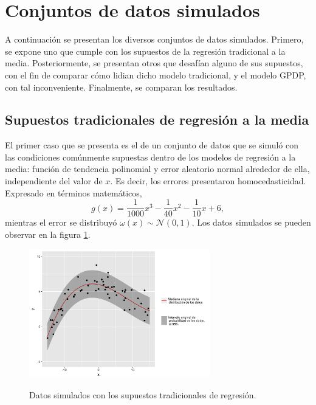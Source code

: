 \section{Conjuntos de datos simulados}

A continuaci\'on se presentan los diversos conjuntos de datos simulados. Primero, se expone uno que cumple con los supuestos de la regresi\'on tradicional a la media. Posteriormente, se presentan otros que desaf\'ian alguno de sus supuestos, con el fin de comparar c\'omo lidian dicho modelo tradicional, y el modelo GPDP, con tal inconveniente. Finalmente, se comparan los resultados.

\subsection{Supuestos tradicionales de regresi\'on a la media}

El primer caso que se presenta es el de un conjunto de datos que se simul\'o con las condiciones com\'unmente supuestas dentro de los modelos de regresi\'on a la media: funci\'on de tendencia polinomial y error aleatorio normal alrededor de ella, independiente del valor de $x$. Es decir, los errores presentaron homocedasticidad. Expresado en t\'erminos matem\'aticos,
\begin{equation*}
    g(x) = \frac{1}{1000}x^3 - \frac{1}{40}x^2 - \frac{1}{10}x + 6,
\end{equation*}
mientras el error se distribuy\'o $\omega(x) \sim \mathcal{N}(0,1)$. Los datos simulados se pueden observar en la figura \ref{sample_classic}.

\begin{figure}[H]
	\centering
	\caption{Datos simulados con los supuestos tradicionales de regresi\'on.}
	\includegraphics[width=0.7\textwidth]{Figures/Simulation/classic/sample.png}
	\label{sample_classic}
\end{figure}

